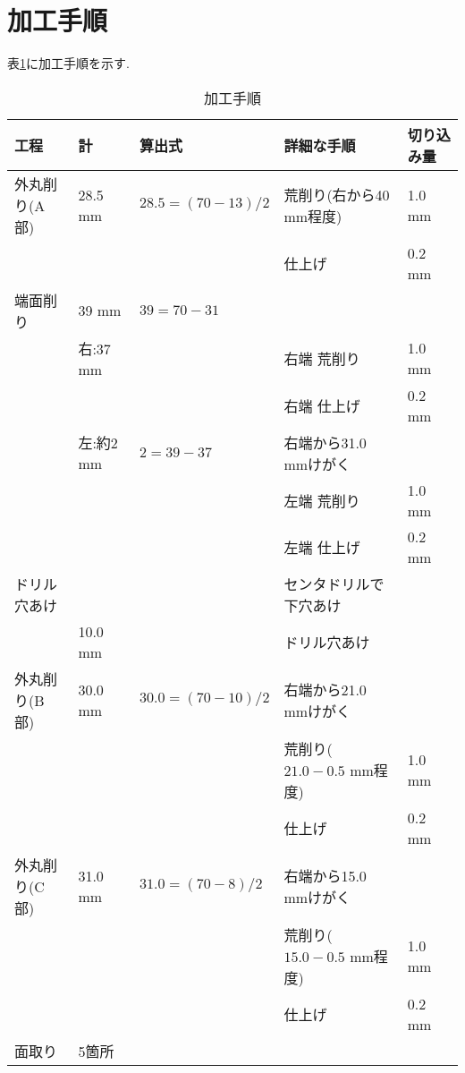 \section{加工手順}
表\ref{tab:tejun}に加工手順を示す.
\begin{table}[h]
  \caption{加工手順}
  \label{tab:tejun}
  \centering
  \begin{tabular}{lllll}
    \hline
    工程&計&算出式&詳細な手順&切り込み量\\
    \hline \hline
    外丸削り(A部)&28.5 mm&$28.5=(70-13)/2$&荒削り(右から40 mm程度)&1.0 mm\\
    &&&仕上げ&0.2 mm\\
    \hline
    端面削り&39 mm&$39=70-31$\\
    &右:37 mm&&右端 荒削り&1.0 mm\\
    &&&右端 仕上げ&0.2 mm\\
    &左:約2 mm&$2=39-37$&右端から31.0 mmけがく\\
    &&&左端 荒削り&1.0 mm\\
    &&&左端 仕上げ&0.2 mm\\
    \hline
    ドリル穴あけ&&&センタドリルで下穴あけ\\
    &10.0 mm&&ドリル穴あけ\\
    \hline
    外丸削り(B部)&30.0 mm&$30.0=(70-10)/2$&右端から21.0 mmけがく\\
    &&&荒削り($21.0-0.5$ mm程度)&1.0 mm\\
    &&&仕上げ&0.2 mm\\
    \hline
    外丸削り(C部)&31.0 mm&$31.0=(70-8)/2$&右端から15.0 mmけがく\\
    &&&荒削り($15.0-0.5$ mm程度)&1.0 mm\\
    &&&仕上げ&0.2 mm\\
    \hline
    面取り&5箇所\\
    \hline
  \end{tabular}
\end{table}